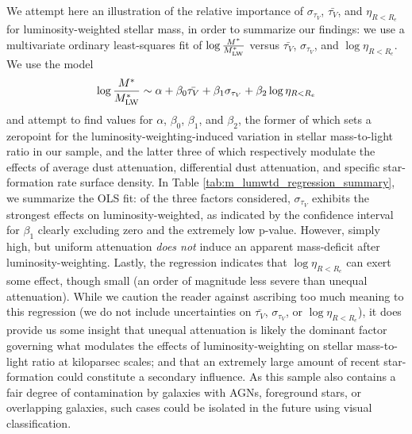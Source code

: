 We attempt here an illustration of the relative importance of $\sigma_{\tau_V}$, $\bar{\tau_V}$, and $\eta_{R < R_e}$ for luminosity-weighted stellar mass, in order to summarize our findings: we use a multivariate ordinary least-squares fit of $\log \frac{M^*}{M^*_{\rm LW}}$ versus $\bar{\tau_V}$, $\sigma_{\tau_V}$, and $\log \eta_{R < R_e}$. We use the model
%
\begin{equation}
    \log \frac{M^*}{M^*_{\rm LW}} \sim \alpha + \beta_0 \bar{\tau_V} + \beta_1 \sigma_{\tau_V} + \beta_2 \log \eta_{R < R_e}
\end{equation}
%
and attempt to find values for $\alpha$, $\beta_0$, $\beta_1$, and $\beta_2$, the former of which sets a zeropoint for the luminosity-weighting-induced variation in stellar mass-to-light ratio in our sample, and the latter three of which respectively modulate the effects of average dust attenuation, differential dust attenuation, and specific star-formation rate surface density. In Table \ref{tab:m_lumwtd_regression_summary}, we summarize the OLS fit: of the three factors considered, $\sigma_{\tau_V}$ exhibits the strongest effects on luminosity-weighted, as indicated by the confidence interval for $\beta_1$ clearly excluding zero and the extremely low p-value. However, simply high, but uniform attenuation \emph{does not} induce an apparent mass-deficit after luminosity-weighting. Lastly, the regression indicates that $\log \eta_{R < R_e}$ can exert some effect, though small (an order of magnitude less severe than unequal attenuation). While we caution the reader against ascribing too much meaning to this regression (we do not include uncertainties on $\bar{\tau_V}$, $\sigma_{\tau_V}$, or $\log \eta_{R < R_e}$), it does provide us some insight that unequal attenuation is likely the dominant factor governing what modulates the effects of luminosity-weighting on stellar mass-to-light ratio at kiloparsec scales; and that an extremely large amount of recent star-formation could constitute a secondary influence. As this sample also contains a fair degree of contamination by galaxies with AGNs, foreground stars, or overlapping galaxies, such cases could be isolated in the future using visual classification.


